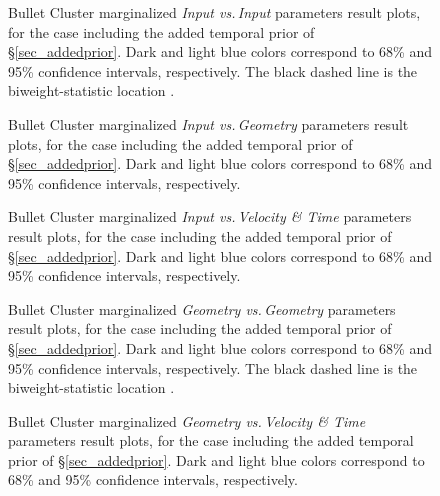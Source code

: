 \documentclass[12pt]{emulateapj}
\begin{document}
\begin{figure}
\caption{Bullet Cluster marginalized \emph{Input vs.\,Input} parameters result plots, for the case including the added temporal prior of \S\ref{sec_addedprior}. Dark and light blue colors correspond to 68\% and 95\% confidence intervals, respectively.  The black dashed line is the biweight-statistic location \citep{Beers:1982dp}. 
\label{fig_bc_inin}}
\end{figure}

\begin{figure}
\caption{Bullet Cluster marginalized \emph{Input vs.\,Geometry} parameters result plots, for the case including the added temporal prior of \S\ref{sec_addedprior}.  Dark and light blue colors correspond to 68\% and 95\% confidence intervals, respectively.
\label{fig_bc_ingeo}}
\end{figure}

\begin{figure}
\caption{Bullet Cluster marginalized \emph{Input vs.\,Velocity \& Time} parameters result plots, for the case including the added temporal prior of \S\ref{sec_addedprior}.  Dark and light blue colors correspond to 68\% and 95\% confidence intervals, respectively.
\label{fig_bc_invt}}
\end{figure}

\begin{figure}
\caption{Bullet Cluster marginalized \emph{Geometry vs.\,Geometry} parameters result plots, for the case including the added temporal prior of \S\ref{sec_addedprior}.  Dark and light blue colors correspond to 68\% and 95\% confidence intervals, respectively.  The black dashed line is the biweight-statistic location \citep{Beers:1982dp}.
\label{fig_bc_geogeo}}
\end{figure}

\begin{figure}
\caption{Bullet Cluster marginalized \emph{Geometry vs.\,Velocity \& Time} parameters result plots, for the case including the added temporal prior of \S\ref{sec_addedprior}.  Dark and light blue colors correspond to 68\% and 95\% confidence intervals, respectively.
\label{fig_bc_geovt}}
\end{figure}
\end{document}
